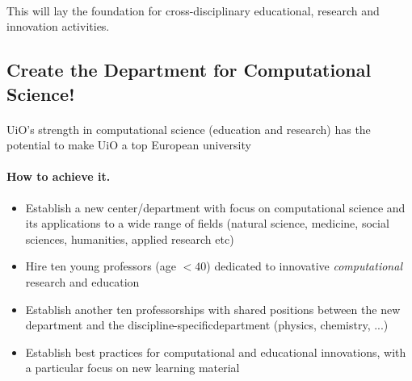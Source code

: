 \documentclass[%
twoside,                 %
final,                   %
10pt]{article}
\begin{document}
\paragraph{}
This will lay the foundation for cross-disciplinary
educational, research and innovation activities.







\subsection*{Create the Department for Computational Science!}


\paragraph{}
UiO's strength in computational science (education and research)
has the potential to make UiO a top European university




\paragraph{How to achieve it.}
\begin{itemize}
\item Establish  a new center/department with focus on computational science and its applications to a wide range of fields (natural science, medicine, social sciences, humanities, applied research etc)

\item Hire ten young professors (age $< 40$) dedicated to innovative \emph{computational} research and education

\item Establish another ten professorships with  shared positions between the  new department and the discipline-specificdepartment (physics, chemistry, ...)

\item Establish  best practices for computational and educational innovations, with a particular focus on  new learning material 
\end{itemize}
\end{document}
